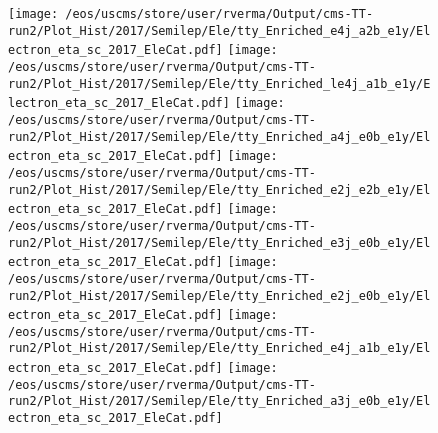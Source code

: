 \begin{figure}
\centering
\texttt{[image: /eos/uscms/store/user/rverma/Output/cms-TT-run2/Plot\_Hist/2017/Semilep/Ele/tty\_Enriched\_e4j\_a2b\_e1y/Electron\_eta\_sc\_2017\_EleCat.pdf]}
\texttt{[image: /eos/uscms/store/user/rverma/Output/cms-TT-run2/Plot\_Hist/2017/Semilep/Ele/tty\_Enriched\_le4j\_a1b\_e1y/Electron\_eta\_sc\_2017\_EleCat.pdf]}
\texttt{[image: /eos/uscms/store/user/rverma/Output/cms-TT-run2/Plot\_Hist/2017/Semilep/Ele/tty\_Enriched\_a4j\_e0b\_e1y/Electron\_eta\_sc\_2017\_EleCat.pdf]}
\texttt{[image: /eos/uscms/store/user/rverma/Output/cms-TT-run2/Plot\_Hist/2017/Semilep/Ele/tty\_Enriched\_e2j\_e2b\_e1y/Electron\_eta\_sc\_2017\_EleCat.pdf]}
\texttt{[image: /eos/uscms/store/user/rverma/Output/cms-TT-run2/Plot\_Hist/2017/Semilep/Ele/tty\_Enriched\_e3j\_e0b\_e1y/Electron\_eta\_sc\_2017\_EleCat.pdf]}
\texttt{[image: /eos/uscms/store/user/rverma/Output/cms-TT-run2/Plot\_Hist/2017/Semilep/Ele/tty\_Enriched\_e2j\_e0b\_e1y/Electron\_eta\_sc\_2017\_EleCat.pdf]}
\texttt{[image: /eos/uscms/store/user/rverma/Output/cms-TT-run2/Plot\_Hist/2017/Semilep/Ele/tty\_Enriched\_e4j\_a1b\_e1y/Electron\_eta\_sc\_2017\_EleCat.pdf]}
\texttt{[image: /eos/uscms/store/user/rverma/Output/cms-TT-run2/Plot\_Hist/2017/Semilep/Ele/tty\_Enriched\_a3j\_e0b\_e1y/Electron\_eta\_sc\_2017\_EleCat.pdf]}
\end{figure}

